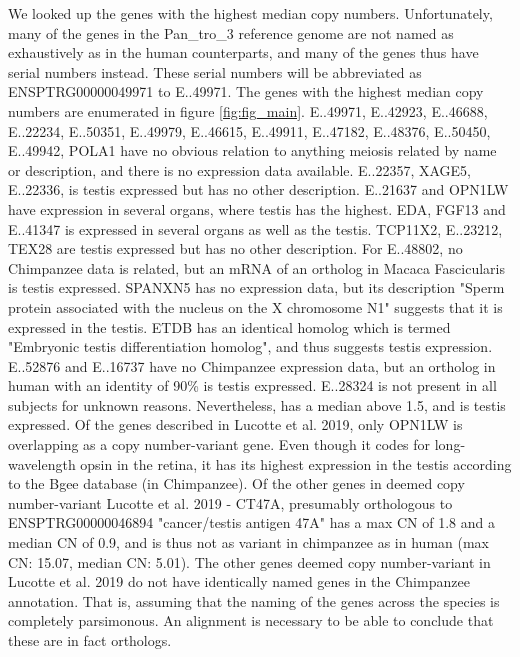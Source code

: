 We looked up the genes with the highest median copy numbers. Unfortunately, many of the genes in the Pan\_tro\_3 reference genome are not named as exhaustively as in the human counterparts, and many of the genes thus have serial numbers instead. These serial numbers will be abbreviated as ENSPTRG00000049971 to E..49971. 
The genes with the highest median copy numbers are enumerated in figure \ref{fig:fig_main}.
\noindent E..49971, E..42923, E..46688,  E..22234, E..50351, E..49979, E..46615, E..49911, E..47182, E..48376, E..50450, E..49942, POLA1 have no obvious relation to anything meiosis related by name or description, and there is no expression data available. E..22357, XAGE5, E..22336,  is testis expressed but has no other description. E..21637 and OPN1LW have expression in several organs, where testis has the highest. EDA, FGF13 and E..41347 is expressed in several organs as well as the testis. TCP11X2, E..23212, TEX28 are testis expressed but has no other description. For E..48802, no Chimpanzee data is related, but an mRNA of an ortholog in Macaca Fascicularis is testis expressed. SPANXN5 has no expression data, but its description "Sperm protein associated with the nucleus on the X chromosome N1" suggests that it is expressed in the testis. ETDB has an identical homolog which is termed "Embryonic testis differentiation homolog", and thus suggests testis expression. E..52876 and E..16737 have no Chimpanzee expression data, but an ortholog in human with an identity of 90\% is testis expressed. E..28324 is not present in all subjects for unknown reasons. Nevertheless, has a median above 1.5, and is testis expressed.
\noindent Of the genes described in Lucotte et al. 2019, only {\footnotesize OPN1LW} is overlapping as a copy number-variant gene. Even though it codes for long-wavelength opsin in the retina, it has its highest expression in the testis according to the Bgee database (in Chimpanzee). Of the other genes in deemed copy number-variant Lucotte et al. 2019 - CT47A, presumably orthologous to ENSPTRG00000046894 "cancer/testis antigen 47A" has a max CN of 1.8 and a median CN of 0.9, and is thus not as variant in chimpanzee as in human (max CN: 15.07, median CN: 5.01). The other genes deemed copy number-variant in Lucotte et al. 2019 do not have identically named genes in the Chimpanzee annotation.
That is, assuming that the naming of the genes across the species is completely parsimonous. An alignment is necessary to be able to conclude that these are in fact orthologs.
\\



